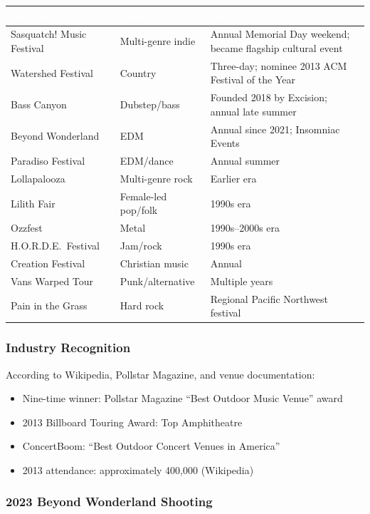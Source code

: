 \documentclass[11pt,letterpaper]{article}
\newcommand{\tableheader}[1]{\textbf{\sffamily\textcolor{white}{#1}}}
\begin{document}
\begin{center}
\begin{tabularx}{\textwidth}{L{3.5cm}L{2.5cm}X}
\toprule
{}
\tableheader{Festival} & \tableheader{Genre} & \tableheader{Notes} \\
\midrule
Sasquatch! Music Festival & Multi-genre indie & Annual Memorial Day weekend; became flagship cultural event \\
Watershed Festival & Country & Three-day; nominee 2013 ACM Festival of the Year \\
Bass Canyon & Dubstep/bass & Founded 2018 by Excision; annual late summer \\
Beyond Wonderland & EDM & Annual since 2021; Insomniac Events \\
Paradiso Festival & EDM/dance & Annual summer \\
Lollapalooza & Multi-genre rock & Earlier era \\
Lilith Fair & Female-led pop/folk & 1990s era \\
Ozzfest & Metal & 1990s--2000s era \\
H.O.R.D.E.\ Festival & Jam/rock & 1990s era \\
Creation Festival & Christian music & Annual \\
Vans Warped Tour & Punk/alternative & Multiple years \\
Pain in the Grass & Hard rock & Regional Pacific Northwest festival \\
\bottomrule
\end{tabularx}
\end{center}

\subsubsection{Industry Recognition}

According to Wikipedia, Pollstar Magazine, and venue documentation:
\begin{itemize}[noitemsep]
  \item Nine-time winner: Pollstar Magazine ``Best Outdoor Music Venue'' award
  \item 2013 Billboard Touring Award: Top Amphitheatre
  \item ConcertBoom: ``Best Outdoor Concert Venues in America''
  \item 2013 attendance: approximately 400,000 (Wikipedia)
\end{itemize}

\subsubsection{2023 Beyond Wonderland Shooting}
\end{document}
